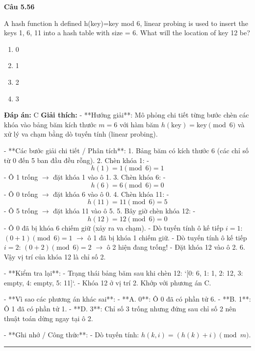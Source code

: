 \documentclass[11pt,a4paper]{article}
\newenvironment{question}[1]{%
  \par\vspace{1em}\noindent\textbf{\large Câu #1}\par\vspace{0.4em}
}{%
  \par\vspace{1em}\hrule\vspace{0.6em}
}
\newenvironment{choices}{%
  \begin{enumerate}[label=\textbf{\Alph*.},leftmargin=2.2em,itemsep=2pt,topsep=3pt]
}{%
  \end{enumerate}
}
\newcommand{\choice}{\item}
\begin{document}
\begin{question}{5.56}
A hash function h defined h(key)=key mod 6, linear probing is used to insert the keys 1, 6, 11 into a hash table with size = 6. What will the location of key 12 be?
\begin{choices}
\choice 0
\choice 1
\choice 2
\choice 3
\end{choices}
\textbf{Đáp án:} C
\textbf{Giải thích:} - **Hướng giải**:
  Mô phỏng chi tiết từng bước chèn các khóa vào bảng băm kích thước \(m = 6\) với hàm băm \(h(\text{key}) = \text{key} \pmod 6\) và xử lý va chạm bằng dò tuyến tính (linear probing).

- **Các bước giải chi tiết / Phân tích**:
  1. Bảng băm có kích thước 6 (các chỉ số từ 0 đến 5 ban đầu đều rỗng).
  2. Chèn khóa 1:
     - \[ h(1) = 1 \pmod 6 = 1 \]
     - Ô 1 trống \(\rightarrow\) đặt khóa 1 vào ô 1.
  3. Chèn khóa 6:
     - \[ h(6) = 6 \pmod 6 = 0 \]
     - Ô 0 trống \(\rightarrow\) đặt khóa 6 vào ô 0.
  4. Chèn khóa 11:
     - \[ h(11) = 11 \pmod 6 = 5 \]
     - Ô 5 trống \(\rightarrow\) đặt khóa 11 vào ô 5.
  5. Bây giờ chèn khóa 12:
     - \[ h(12) = 12 \pmod 6 = 0 \]
     - Ô 0 đã bị khóa 6 chiếm giữ (xảy ra va chạm).
     - Dò tuyến tính ô kế tiếp \(i = 1\): \((0 + 1) \pmod 6 = 1\) \(\rightarrow\) ô 1 đã bị khóa 1 chiếm giữ.
     - Dò tuyến tính ô kế tiếp \(i = 2\): \((0 + 2) \pmod 6 = 2\) \(\rightarrow\) ô 2 hiện đang trống!
     - Đặt khóa 12 vào ô 2.
  6. Vậy vị trí của khóa 12 là chỉ số 2.

- **Kiểm tra lại**:
  - Trạng thái bảng băm sau khi chèn 12: `[0: 6, 1: 1, 2: 12, 3: empty, 4: empty, 5: 11]`.
  - Khóa 12 ở vị trí 2. Khớp với phương án C.

- **Vì sao các phương án khác sai**:
  - **A. 0**: Ô 0 đã có phần tử 6.
  - **B. 1**: Ô 1 đã có phần tử 1.
  - **D. 3**: Chỉ số 3 trống nhưng đứng sau chỉ số 2 nên thuật toán dừng ngay tại ô 2.

- **Ghi nhớ / Công thức**:
  - Dò tuyến tính: \(h(k, i) = (h(k) + i) \pmod m\).
\end{question}
\end{document}
